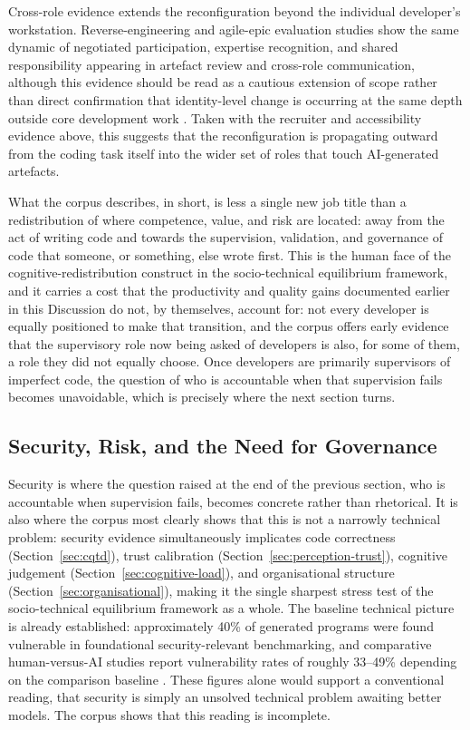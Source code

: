 Cross-role evidence extends the reconfiguration beyond the individual developer's workstation. Reverse-engineering and agile-epic evaluation studies show the same dynamic of negotiated participation, expertise recognition, and shared responsibility appearing in artefact review and cross-role communication, although this evidence should be read as a cautious extension of scope rather than direct confirmation that identity-level change is occurring at the same depth outside core development work \cite{surk_reducing_2026}. Taken with the recruiter and accessibility evidence above, this suggests that the reconfiguration is propagating outward from the coding task itself into the wider set of roles that touch AI-generated artefacts.

What the corpus describes, in short, is less a single new job title than a redistribution of where competence, value, and risk are located: away from the act of writing code and towards the supervision, validation, and governance of code that someone, or something, else wrote first. This is the human face of the cognitive-redistribution construct in the socio-technical equilibrium framework, and it carries a cost that the productivity and quality gains documented earlier in this Discussion do not, by themselves, account for: not every developer is equally positioned to make that transition, and the corpus offers early evidence that the supervisory role now being asked of developers is also, for some of them, a role they did not equally choose. Once developers are primarily supervisors of imperfect code, the question of who is accountable when that supervision fails becomes unavoidable, which is precisely where the next section turns.

\subsection{Security, Risk, and the Need for Governance}
\label{sec:disc-security-governance}
Security is where the question raised at the end of the previous section, who is accountable when supervision fails, becomes concrete rather than rhetorical. It is also where the corpus most clearly shows that this is not a narrowly technical problem: security evidence simultaneously implicates code correctness (Section~\ref{sec:cqtd}), trust calibration (Section~\ref{sec:perception-trust}), cognitive judgement (Section~\ref{sec:cognitive-load}), and organisational structure (Section~\ref{sec:organisational}), making it the single sharpest stress test of the socio-technical equilibrium framework as a whole. The baseline technical picture is already established: approximately 40\% of generated programs were found vulnerable in foundational security-relevant benchmarking, and comparative human-versus-AI studies report vulnerability rates of roughly 33--49\% depending on the comparison baseline \cite{pearce_asleep_2025,asare_is_2024}. These figures alone would support a conventional reading, that security is simply an unsolved technical problem awaiting better models. The corpus shows that this reading is incomplete.

